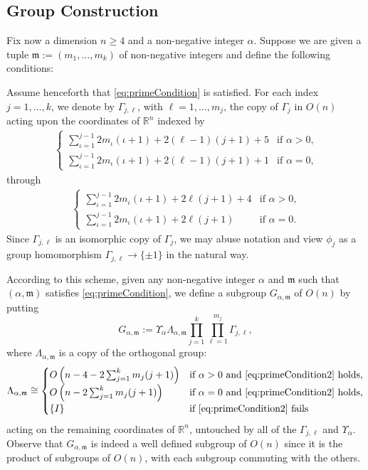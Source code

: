\documentclass[10pt, reqno]{amsart}
\newcommand{\RR}{\mathbb{R}}
\newcommand{\m}{\mathfrak{m}}
\numberwithin{equation}{section}
\theoremstyle{definition}
\theoremstyle{remark}
\theoremstyle{plain}
\begin{document}
	\subsection{Group Construction}
	
	Fix now a dimension $n \ge 4$ and a non-negative integer $\alpha$. Suppose we are given a tuple $\m := (m_1,\dots, m_k)$ of non-negative integers and define the following conditions:
	
	Assume henceforth that \eqref{eq:primeCondition} is satisfied.
	For each index $j = 1,\dots, k$, we denote by $\Gamma_{j,\ell}$, with $\ell = 1,\dots, m_j$, the copy of $\Gamma_j$ in $O(n)$ acting upon the coordinates of $\RR^n$ indexed by
	\begin{align*}
		\begin{cases}
			\sum_{\iota=1}^{j-1} 2m_\iota (\iota+1) + 2(\ell-1)(j+1) + 5 & \text{if $\alpha > 0$,}\\
			\sum_{\iota=1}^{j-1} 2m_\iota (\iota+1) + 2(\ell-1)(j+1) + 1 & \text{if $\alpha = 0$,}
		\end{cases}
	\end{align*}
	through
	\begin{align*}
		\begin{cases}
			\sum_{\iota=1}^{j-1} 2m_\iota (\iota+1) + 2\ell (j+1) +4 & \text{if $\alpha > 0$,}\\
			\sum_{\iota=1}^{j-1} 2m_\iota (\iota+1) + 2\ell (j+1) & \text{if $\alpha = 0$.}
		\end{cases}
	\end{align*}
	Since $\Gamma_{j,\ell}$ is an isomorphic copy of $\Gamma_j$, we may abuse notation and view $\phi_j$ as a group homomorphism $\Gamma_{j,\ell} \to \{\pm 1\}$ in the natural way. 
	
	According to this scheme, given any non-negative integer $\alpha$ and $\m$ such that $(\alpha,\m)$ satisfies \eqref{eq:primeCondition}, we define a subgroup $G_{\alpha,\m}$ of $O(n)$ by putting 
	\begin{equation}\label{eq:primeGroupDef}
		G_{\alpha, \m} := \Upsilon_\alpha\Lambda_{\alpha,\m}\prod_{j=1}^k \prod_{\ell=1}^{m_j} \Gamma_{j,\ell},
	\end{equation}
	where $\Lambda_{\alpha,\m}$ is a copy of the orthogonal group:
	\[
	\Lambda_{\alpha,\m} \cong \begin{cases}
		O\left( n - 4 - 2\sum_{j=1}^k m_j(j+1)\right) & \text{if $\alpha > 0$ and \eqref{eq:primeCondition2} holds},\\
		O\left( n -  2\sum_{j=1}^k m_j(j+1)\right) & \text{if $\alpha = 0$ and \eqref{eq:primeCondition2} holds},\\
		\{I\} & \text{if \eqref{eq:primeCondition2} fails}
	\end{cases}
	\] acting on the remaining coordinates of $\RR^n$, untouched by all of the $\Gamma_{j,\ell}$ and $\Upsilon_\alpha$. Observe that $G_{\alpha,\m}$ is indeed a well defined subgroup of $O(n)$ since it is the product of subgroups of $O(n)$, with each subgroup commuting with the others.
	
\end{document}
